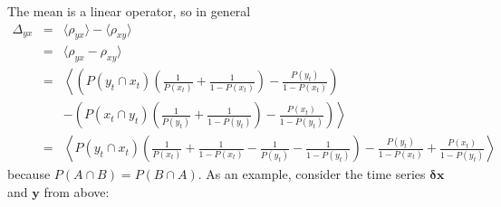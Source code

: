\documentclass[a4paper,11pt]{article}
\begin{document}
The mean is a linear operator, so in general
\begin{eqnarray}
\Delta_{yx} &=& \langle \rho_{yx}\rangle - \langle \rho_{xy}\rangle\\
&=& \langle \rho_{yx} - \rho_{xy}\rangle\\
&=& \left\langle \left( P(y_t\cap x_t)\left(\frac{1}{P(x_t)}+\frac{1}{1-P(x_t)}\right)-\frac{P(y_t)}{1-P(x_t)}\right) \right.\\
& & \left.- \left( P(x_t\cap y_t)\left(\frac{1}{P(y_t)}+\frac{1}{1-P(y_t)}\right)-\frac{P(x_t)}{1-P(y_t)} \right) \right\rangle\\
&=& \left\langle P(y_t\cap x_t) \left( \frac{1}{P(x_t)}+\frac{1}{1-P(x_t)} - \frac{1}{P(y_t)}-\frac{1}{1-P(y_t)}\right) -\frac{P(y_t)}{1-P(x_t)}+\frac{P(x_t)}{1-P(y_t)}  \right\rangle
\end{eqnarray}
because $P(A\cap B) = P(B\cap A)$.  As an example, consider the time series $\mathbf{\delta x}$ and $\mathbf{y}$ from above:
\end{document}
